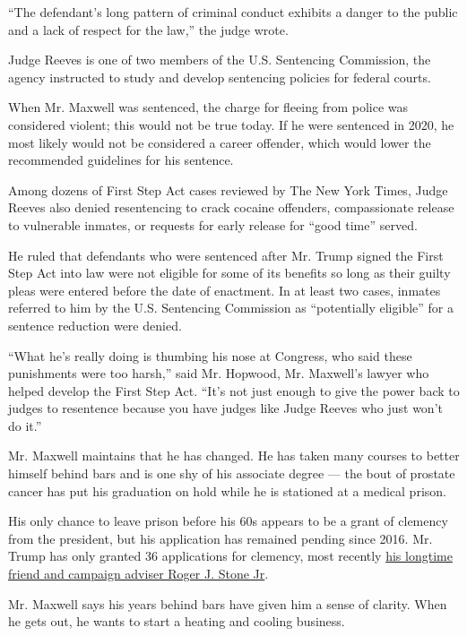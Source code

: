 ``The defendant's long pattern of criminal conduct exhibits a danger to
the public and a lack of respect for the law,'' the judge wrote.

Judge Reeves is one of two members of the U.S. Sentencing Commission,
the agency instructed to study and develop sentencing policies for
federal courts.

When Mr. Maxwell was sentenced, the charge for fleeing from police was
considered violent; this would not be true today. If he were sentenced
in 2020, he most likely would not be considered a career offender, which
would lower the recommended guidelines for his sentence.

Among dozens of First Step Act cases reviewed by The New York Times,
Judge Reeves also denied resentencing to crack cocaine offenders,
compassionate release to vulnerable inmates, or requests for early
release for ``good time'' served.

He ruled that defendants who were sentenced after Mr. Trump signed the
First Step Act into law were not eligible for some of its benefits so
long as their guilty pleas were entered before the date of enactment. In
at least two cases, inmates referred to him by the U.S. Sentencing
Commission as ``potentially eligible'' for a sentence reduction were
denied.

``What he's really doing is thumbing his nose at Congress, who said
these punishments were too harsh,'' said Mr. Hopwood, Mr. Maxwell's
lawyer who helped develop the First Step Act. ``It's not just enough to
give the power back to judges to resentence because you have judges like
Judge Reeves who just won't do it.''

Mr. Maxwell maintains that he has changed. He has taken many courses to
better himself behind bars and is one shy of his associate degree ---
the bout of prostate cancer has put his graduation on hold while he is
stationed at a medical prison.

His only chance to leave prison before his 60s appears to be a grant of
clemency from the president, but his application has remained pending
since 2016. Mr. Trump has only granted 36 applications for clemency,
most recently
\href{https://www.nytimes3xbfgragh.onion/2020/07/10/us/politics/trump-roger-stone-clemency.html}{his
longtime friend and campaign adviser Roger J. Stone Jr}.

Mr. Maxwell says his years behind bars have given him a sense of
clarity. When he gets out, he wants to start a heating and cooling
business.

